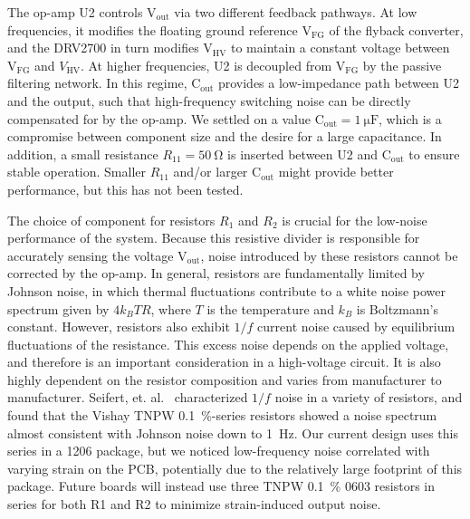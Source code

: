 \documentclass[aip,rsi,reprint]{revtex4-1} %
\begin{document}
The op-amp U2 controls $\text{V}_\text{out}$ via two different feedback pathways.
At low frequencies, it modifies the floating ground reference $\text{V}_\text{FG}$ of the flyback converter, and the DRV2700 in turn modifies $\text{V}_\text{HV}$ to maintain a constant voltage between $\text{V}_\text{FG}$ and $V_\text{HV}$.
At higher frequencies, U2 is decoupled from $\text{V}_\text{FG}$ by the passive filtering network.
In this regime, $\text{C}_\text{out}$ provides a low-impedance path between U2 and the output, such that high-frequency switching noise can be directly compensated for by the op-amp.
We settled on a value $\text{C}_\text{out}=\SI{1}{\micro\farad}$, which is a compromise between component size and the desire for a large capacitance.
In addition, a small resistance $R_{11} = \SI{50}{\ohm}$ is inserted between U2 and $\text{C}_\text{out}$ to ensure stable operation.
Smaller $R_{11}$ and/or larger $\text{C}_\text{out}$ might provide better performance, but this has not been tested.

The choice of component for resistors $R_1$ and $R_2$ is crucial for the low-noise performance of the system. 
Because this resistive divider is responsible for accurately sensing the voltage $\text{V}_\text{out}$, noise introduced by these resistors cannot be corrected by the op-amp.
In general, resistors are fundamentally limited by Johnson noise, in which thermal fluctuations contribute to a white noise power spectrum given by $4 k_B T R$, where $T$ is the temperature and $k_B$ is Boltzmann's constant.\cite{Horowitz2015a:JN}
However, resistors also exhibit $1/f$ current noise caused by equilibrium fluctuations of the resistance.\cite{Clarke1974a,Voss1976a}
This excess noise depends on the applied voltage, and therefore is an important consideration in a high-voltage circuit.
It is also highly dependent on the resistor composition and varies from manufacturer to manufacturer.
Seifert, et. al.~\cite{Seifert2009a} characterized $1/f$ noise in a variety of resistors, and found that the Vishay TNPW \SI{0.1}{\percent}-series resistors showed a noise spectrum almost consistent with Johnson noise down to \SI{1}{\hertz}.
Our current design uses this series in a 1206 package, but we noticed low-frequency noise correlated with varying strain on the PCB, potentially due to the relatively large footprint of this package.
Future boards will instead use three TNPW \SI{0.1}{\percent} 0603 resistors in series for both R1 and R2 to minimize strain-induced output noise.
\end{document}
